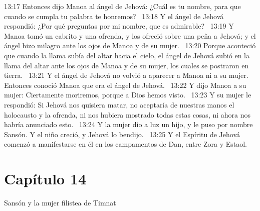13:17 Entonces dijo Manoa al ángel de Jehová: ¿Cuál es tu nombre, para que cuando se cumpla tu palabra te honremos?  
13:18 Y el ángel de Jehová respondió: ¿Por qué preguntas por mi nombre, que es admirable?  
13:19 Y Manoa tomó un cabrito y una ofrenda, y los ofreció sobre una peña a Jehová; y el ángel hizo milagro ante los ojos de Manoa y de su mujer.  
13:20 Porque aconteció que cuando la llama subía del altar hacia el cielo, el ángel de Jehová subió en la llama del altar ante los ojos de Manoa y de su mujer, los cuales se postraron en tierra.  
13:21 Y el ángel de Jehová no volvió a aparecer a Manoa ni a su mujer. Entonces conoció Manoa que era el ángel de Jehová.  
13:22 Y dijo Manoa a su mujer: Ciertamente moriremos, porque a Dios hemos visto.  
13:23 Y su mujer le respondió: Si Jehová nos quisiera matar, no aceptaría de nuestras manos el holocausto y la ofrenda, ni nos hubiera mostrado todas estas cosas, ni ahora nos habría anunciado esto.  
13:24 Y la mujer dio a luz un hijo, y le puso por nombre Sansón. Y el niño creció, y Jehová lo bendijo.  
13:25 Y el Espíritu de Jehová comenzó a manifestarse en él en los campamentos de Dan, entre Zora y Estaol.  
\section*{Capítulo 14}
Sansón y la mujer filistea de Timnat  

